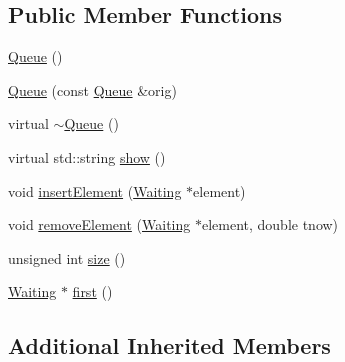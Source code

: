 \subsection*{Public Member Functions}
\begin{DoxyCompactItemize}
\item 
\hyperlink{class_queue_a7cfca3637d57c4a9e37351b3426ffd40}{Queue} ()
\item 
\hyperlink{class_queue_a09f908d6edb810d86871bda50fdf4bac}{Queue} (const \hyperlink{class_queue}{Queue} \&orig)
\item 
virtual \hyperlink{class_queue_a00d119db8fa3050da37746e82cbcf94f}{$\sim$\-Queue} ()
\item 
virtual std\-::string \hyperlink{class_queue_ac78cc84cd91539c7f38d95dc17dabac5}{show} ()
\item 
void \hyperlink{class_queue_a961b5b7ca80317aa69f958612fb988ad}{insert\-Element} (\hyperlink{class_waiting}{Waiting} $\ast$element)
\item 
void \hyperlink{class_queue_a114d5144b3026b57cca9cf481b1f0d65}{remove\-Element} (\hyperlink{class_waiting}{Waiting} $\ast$element, double tnow)
\item 
unsigned int \hyperlink{class_queue_a4cd92f99b7abc9ec4df32690dc5a037d}{size} ()
\item 
\hyperlink{class_waiting}{Waiting} $\ast$ \hyperlink{class_queue_a39a1f5a1733f61634339ecee7aac7907}{first} ()
\end{DoxyCompactItemize}
\subsection*{Additional Inherited Members}


